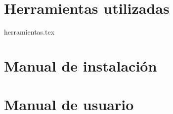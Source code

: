 \appendix
\chapter{Herramientas utilizadas}
 {herramientas.tex}
\chapter{Manual de instalación}

\chapter{Manual de usuario}

